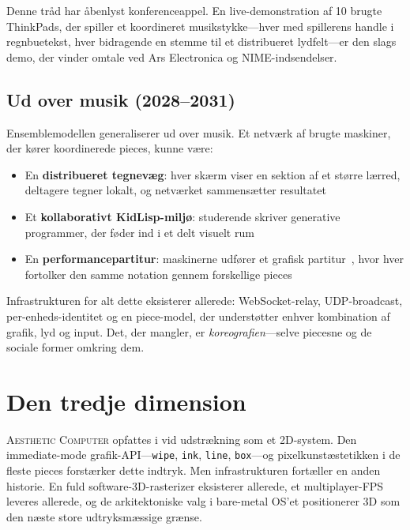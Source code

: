 \documentclass[10pt,letterpaper,twocolumn]{article}
\newcommand{\ac}{\textsc{Aesthetic Computer}}
\begin{document}
Denne tråd har åbenlyst konferenceappel. En live-demonstration af 10 brugte ThinkPads, der spiller et koordineret musikstykke---hver med spillerens handle i regnbuetekst, hver bidragende en stemme til et distribueret lydfelt---er den slags demo, der vinder omtale ved Ars Electronica og NIME-indsendelser.

\subsection{Ud over musik (2028--2031)}

Ensemblemodellen generaliserer ud over musik. Et netværk af brugte maskiner, der kører koordinerede pieces, kunne være:

\begin{itemize}
  \item En \textbf{distribueret tegnevæg}: hver skærm viser en sektion af et større lærred, deltagere tegner lokalt, og netværket sammensætter resultatet
  \item Et \textbf{kollaborativt KidLisp-miljø}: studerende skriver generative programmer, der føder ind i et delt visuelt rum
  \item En \textbf{performancepartitur}: maskinerne udfører et grafisk partitur~\citep{scudder2026pieces}, hvor hver fortolker den samme notation gennem forskellige pieces
\end{itemize}

Infrastrukturen for alt dette eksisterer allerede: WebSocket-relay, UDP-broadcast, per-enheds-identitet og en piece-model, der understøtter enhver kombination af grafik, lyd og input. Det, der mangler, er \emph{koreografien}---selve piecesne og de sociale former omkring dem.


\section{Den tredje dimension}
\label{sec:3d}

\ac{} opfattes i vid udstrækning som et 2D-system. Den immediate-mode grafik-API---\texttt{wipe}, \texttt{ink}, \texttt{line}, \texttt{box}---og pixelkunstæstetikken i de fleste pieces forstærker dette indtryk. Men infrastrukturen fortæller en anden historie. En fuld software-3D-rasterizer eksisterer allerede, et multiplayer-FPS leveres allerede, og de arkitektoniske valg i bare-metal OS'et positionerer 3D som den næste store udtryksmæssige grænse.
\end{document}
